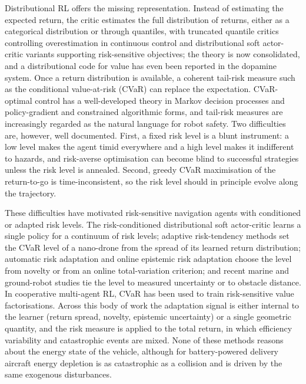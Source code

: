 Distributional RL offers the missing representation. Instead of estimating the expected return, the critic estimates the full distribution of returns, either as a categorical distribution\cite{bellemare2017distributional} or through quantiles\cite{dabney2018qr,dabney2018iqn}, with truncated quantile critics controlling overestimation in continuous control\cite{kuznetsov2020tqc} and distributional soft actor-critic variants supporting risk-sensitive objectives\cite{ma2025dsac}; the theory is now consolidated\cite{bellemare2023book}, and a distributional code for value has even been reported in the dopamine system\cite{dabney2020dopamine}. Once a return distribution is available, a coherent tail-risk measure such as the conditional value-at-risk (CVaR)\cite{rockafellar2000cvar} can replace the expectation. CVaR-optimal control has a well-developed theory in Markov decision processes\cite{chow2015cvar,bauerle2011avar,wang2023minimax} and policy-gradient\cite{tamar2015cvar,tang2019wcpg} and constrained\cite{yang2021wcsac} algorithmic forms, and tail-risk measures are increasingly regarded as the natural language for robot safety\cite{majumdar2020risk,akella2025riskaware,chapman2022risk,hakobyan2019risk,royset2025riskadaptive}. Two difficulties are, however, well documented. First, a fixed risk level is a blunt instrument: a low level makes the agent timid everywhere and a high level makes it indifferent to hazards, and risk-averse optimisation can become blind to successful strategies unless the risk level is annealed\cite{greenberg2022cesor}. Second, greedy CVaR maximisation of the return-to-go is time-inconsistent, so the risk level should in principle evolve along the trajectory\cite{lim2022distributional,bauerle2011avar}.

These difficulties have motivated risk-sensitive navigation agents with conditioned or adapted risk levels. The risk-conditioned distributional soft actor-critic learns a single policy for a continuum of risk levels\cite{choi2021rcdsac}; adaptive risk-tendency methods set the CVaR level of a nano-drone from the spread of its learned return distribution\cite{liu2023art,seres2023flight}; automatic risk adaptation and online epistemic risk adaptation choose the level from novelty or from an online total-variation criterion\cite{schubert2021ara,wu2026drlora}; and recent marine and ground-robot studies tie the level to measured uncertainty or to obstacle distance\cite{huang2025usv,wang2026diqn,lin2023usv,zhang2025driqn,wang2025adaptive,schneider2024quadruped}. In cooperative multi-agent RL, CVaR has been used to train risk-sensitive value factorisations\cite{qiu2021rmix,shen2023riskq}. Across this body of work the adaptation signal is either internal to the learner (return spread, novelty, epistemic uncertainty) or a single geometric quantity, and the risk measure is applied to the total return, in which efficiency variability and catastrophic events are mixed. None of these methods reasons about the energy state of the vehicle, although for battery-powered delivery aircraft energy depletion is as catastrophic as a collision and is driven by the same exogenous disturbances.

